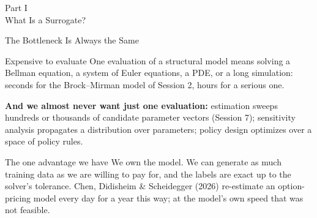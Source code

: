 \documentclass[aspectratio=169,11pt]{beamer}
\newcommand{\emphc}[1]{\textcolor{harvardcrimson}{#1}}
\begin{document}

\begin{frame}{}
\begin{center}
{\Huge \textcolor{uzhblue}{Part I}}\\[0.8em]
{\LARGE What Is a Surrogate?}
\end{center}
\end{frame}

\begin{frame}{The Bottleneck Is Always the Same}
\small
\begin{block}{Expensive to evaluate}
One evaluation of a structural model means solving a Bellman equation, a system of Euler equations, a PDE, or a long simulation: seconds for the Brock--Mirman model of Session 2, hours for a serious one.
\end{block}

\vspace{0.15cm}
\textbf{And we almost never want just one evaluation:} \emphc{estimation} sweeps hundreds or thousands of candidate parameter vectors (Session 7); \emphc{sensitivity analysis} propagates a distribution over parameters; \emphc{policy design} optimizes over a space of policy rules.

\vspace{0.15cm}
\begin{alertblock}{The one advantage we have}
\emphc{We own the model.} We can generate as much training data as we are willing to pay for, and the labels are exact up to the solver's tolerance. Chen, Didisheim \& Scheidegger (2026) re-estimate an option-pricing model every day for a year this way; at the model's own speed that was not feasible.
\end{alertblock}
\end{frame}
\end{document}
